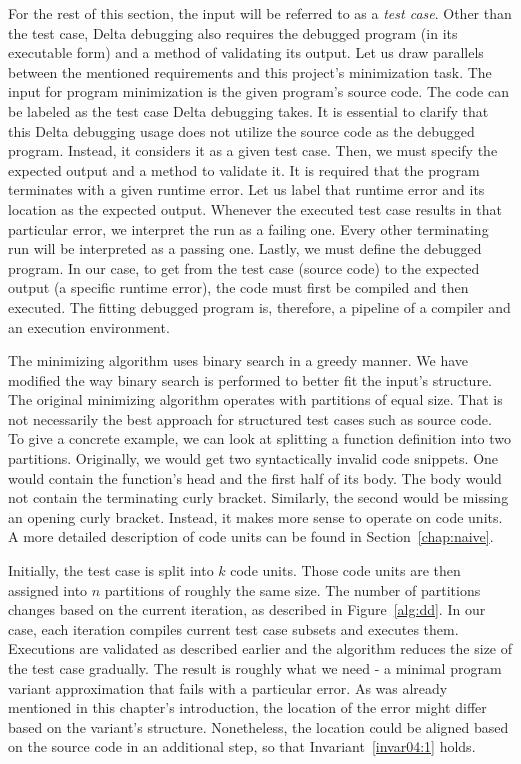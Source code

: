 For the rest of this section, the input will be referred to as 
a \emph{test case}.
Other than the test case, Delta debugging also requires the debugged program 
(in its executable form) and a method of validating its output.
Let us draw parallels between the mentioned requirements and this project's 
minimization task.
The input for program minimization is the given program's source code.
The code can be labeled as the test case Delta debugging takes.
It is essential to clarify that this Delta debugging usage does not utilize 
the source code as the debugged program.
Instead, it considers it as a given test case.
Then, we must specify the expected output and a method to validate it.
It is required that the program terminates with a given runtime error.
Let us label that runtime error and its location as the expected output.
Whenever the executed test case results in that particular error, we 
interpret the run as a failing one.
Every other terminating run will be interpreted as a passing one.
Lastly, we must define the debugged program.
In our case, to get from the test case (source code) to the expected 
output (a specific runtime error), the code must first be compiled 
and then executed.
The fitting debugged program is, therefore, a pipeline of a compiler and 
an execution environment.

The minimizing algorithm uses binary search in a greedy manner.
We have modified the way binary search is performed to better fit the input's
structure.
The original minimizing algorithm operates with partitions of equal size.
That is not necessarily the best approach for structured test cases such
as source code.
To give a concrete example, we can look at splitting a function definition
into two partitions.
Originally, we would get two syntactically invalid code snippets.
One would contain the function's head and the first half of its body.
The body would not contain the terminating curly bracket.
Similarly, the second would be missing an opening curly bracket.
Instead, it makes more sense to operate on code units.
A more detailed description of code units can be found in 
Section~\ref{chap:naive}.

Initially, the test case is split into $k$ code units.
Those code units are then assigned into $n$ partitions of roughly the same 
size.
The number of partitions changes based on the current iteration, as described
in Figure~\ref{alg:dd}.
In our case, each iteration compiles current test case subsets and executes 
them.
Executions are validated as described earlier and the algorithm reduces
the size of the test case gradually.
The result is roughly what we need - a minimal program variant approximation 
that fails with a particular error.
As was already mentioned in this chapter's introduction, the location of 
the error might differ based on the variant's structure.
Nonetheless, the location could be aligned based on the source code in 
an additional step, so that Invariant~\ref{invar04:1} holds.


